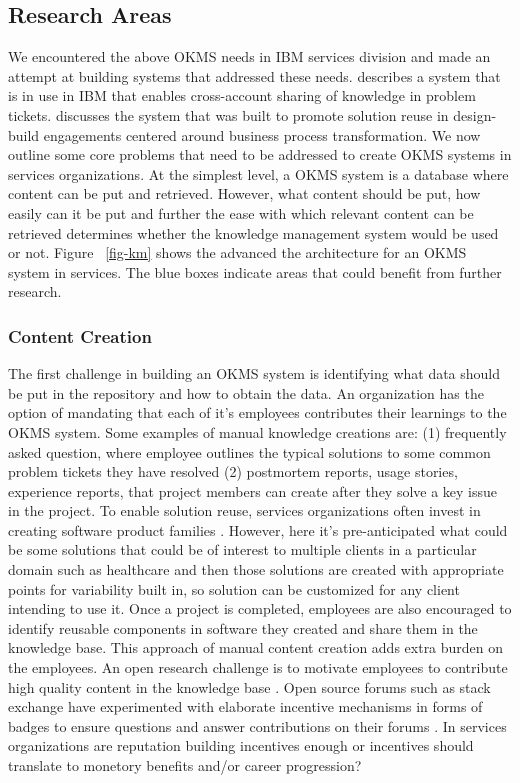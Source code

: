\subsection{Research Areas}

We encountered the above OKMS needs in IBM services division and made an attempt at building systems that addressed these needs. \cite{Majumdar:2011} describes a system that is in use in IBM that enables cross-account sharing of knowledge in problem tickets. \cite{Goodwin:2012b} discusses the system that was built to promote solution reuse in design-build engagements centered around business process transformation. We now outline some core problems that need to be addressed to create OKMS systems in services organizations. At the simplest level, a OKMS system is a database where content can be put and retrieved. However, what content should be put, how easily can it be put and further the ease with which relevant content can be retrieved determines whether the knowledge management system would be used or not. 
Figure ~\ref{fig-km} shows the advanced the architecture for an OKMS system in services. The blue boxes indicate areas that could benefit from further research. 

\subsubsection{Content Creation}

The first challenge in building an OKMS system is identifying what data should be put in the repository and how to obtain the data. An organization has the option of mandating that each of it's employees contributes their learnings to the OKMS system. Some examples of manual knowledge creations are: (1) frequently asked question, where employee outlines the typical solutions to some common problem tickets they have resolved (2) postmortem reports, usage stories, experience reports\cite{desouza:2005}, that project members can create after they solve a key issue in the project. To enable solution reuse, services organizations often invest in creating software product families \cite{clements2002software}. However, here it's pre-anticipated what could be some solutions that could be of interest to multiple clients in a particular domain such as healthcare and then those solutions are created with appropriate points for variability built in, so solution can be customized for any client intending to use it.  Once a project is completed, employees are also encouraged to identify reusable components in software they created and share them in the knowledge base. This approach of manual content creation adds extra burden on the employees. An open research challenge is to motivate employees to contribute high quality content in the knowledge base \cite{}. Open source forums such as stack exchange have experimented with elaborate incentive mechanisms in forms of badges to ensure questions and answer contributions on their forums \cite{}. In services organizations are reputation building incentives enough or incentives should translate to monetory benefits and/or career progression? 

